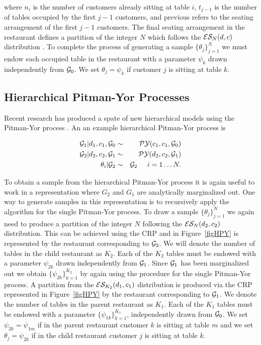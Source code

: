 where $n_i$ is the number of customers already sitting at table $i$, $t_{j-1}$ is the number of tables occupied by the first $j-1$ customers, and previous refers to the seating arrangement of the first $j-1$ customers.  The final seating arrangement in the restaurant defines a partition of the integer $N$ which follows the $\ES_N(d,c)$ distribution \cite{Pitman1995}.  To complete the process of generating a sample $\{ \theta_j \}_{j = 1}^N$ we must endow each occupied table in the restaurant with a parameter $\psi_k$ drawn independently from $\G_0$.  We set $\theta_j = \psi_k$ if customer $j$ is sitting at table $k$.


\subsection{Hierarchical Pitman-Yor Processes}

Recent research has produced a spate of new hierarchical models using the Pitman-Yor process \cite{Teh2006b} \cite{Teh2006a}.  An an example hierarchical Pitman-Yor process is 

\begin{eqnarray*}
\G_1|d_1, c_1, \G_0 &\sim& \PY(c_1,c_1,\G_0)\\
\G_2 | d_2, c_2, \G_1 &\sim& \PY(d_2,c_2, \G_1)\\
\theta_i | \G_2 &\sim& \G_2 \hspace{.5cm} i = 1\dots N.
\end{eqnarray*}

To obtain a sample from the hierarchical Pitman-Yor process it is again useful to work in a representation where $G_2$ and $G_1$ are analytically marginalized out. One way to generate samples in this representation is to recursively apply the algorithm for the single Pitman-Yor process.  To draw a sample $\{ \theta_j \}_{j = 1}^N$ we again need to produce a partition of the integer $N$ following the $\ES_N(d_2,c_2)$ distribution.  This can be achieved using the CRP and in Figure~\ref{figHPY} is represented by the restaurant corresponding to $\G_2$. We will denote the number of tables in the child restaurant as $K_2$.  Each of the $K_2$ tables must be endowed with a parameter $ \psi_{2k}$ drawn independently from $\G_1$.  Since $\G_1$ has been marginalized out we obtain $\{ \psi_{2k} \}_ {k = 1}^{K_2}$ by again using the procedure for the single Pitman-Yor process.  A partition from the $\ES_{K_2}(d_1,c_1)$ distribution is produced via the CRP represented in Figure~\ref{figHPY} by the restaurant corresponding to $\G_1$. We denote the number of tables in the parent restaurant as $K_1$.   Each of the $K_1$ tables must be endowed with a parameter $\{ \psi_{1k} \}_{ k = 1}^{K_1}$,  independently drawn from $\G_0$.  We set $\psi_{2k}  = \psi_{1m}$ if in the parent restaurant customer $k$ is sitting at table $m$ and we set $\theta_j = \psi_{2k}$ if in the child restaurant customer $j$ is sitting at table $k$.


